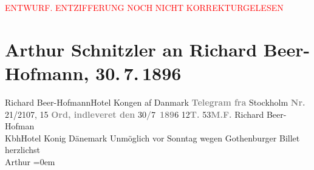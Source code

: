 
\begin{center}
            \textcolor{red}{ENTWURF. ENTZIFFERUNG NOCH NICHT KORREKTURGELESEN}
                      \end{center}
            
               \section[Arthur Schnitzler an Richard Beer-Hofmann, 30. 7. 1896]{ Arthur Schnitzler an Richard Beer-Hofmann, 30. 7. 1896}\nopagebreak{}\rehead{ }\begin{ledgroupsized}[t]{13cm}\normalsize\beginnumbering{} \toendnotes[C]{\smallbreak\pagebreak[2]} 
\pstart{}{\pb}Richard Beer-Hofmann\pend{}\pstart{}Hotel Kongen af Danmark\pend{}{\bigskip}\pstart
           \noindent{}\centering{}{\pb}\textcolor{gray}{\textbf{Telegram
                  fra}}{ }Stockholm\pend
           \pstart
           \noindent{}\textcolor{gray}{\textbf{Nr.}} 21/2107, 15 \textcolor{gray}{\textbf{Ord, indleveret
                  den}}{ }30\textcolor{gray}{\textbf{/}}7 \textcolor{gray}{\textbf{189}}6{ }12\textcolor{gray}{\textbf{T.}}{ }53\textcolor{gray}{\textbf{M.F.}}\pend
           \pstart
           \raggedleft{}Richard Beer-Hofman{\\}KbhHotel Konig
               Dänemark\pend
           \pstart
           \noindent{}Unmöglich vor{ }Sonntag wegen Gothenburger Billet\pend
           \pstart
           herzlichst{\\[\baselineskip]}\spacefill\mbox{Arthur}\pend
           \leftskip=0em{}\endnumbering{}\end{ledgroupsized}  \newcommand{\dateiname}{L00574}\newcommand{\titel}{Arthur Schnitzler an Richard Beer-Hofmann, 30. 7. 1896}\newcommand{\editorInnen}{Martin Anton Müller und Gerd-Hermann Susen}
      